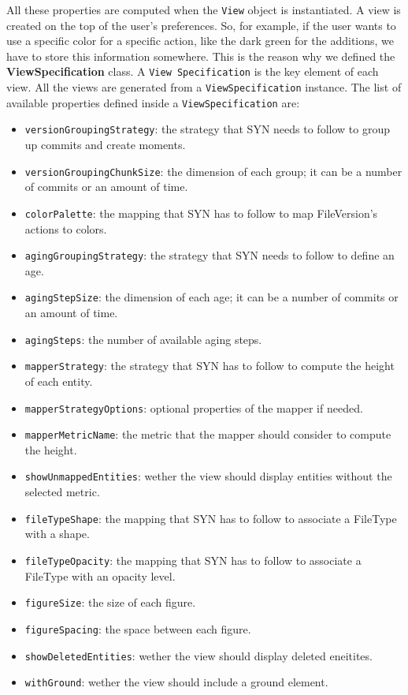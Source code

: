 All these properties are computed when the \texttt{View} object is instantiated. A view is created on the top of the user's preferences. 
So, for example, if the user wants to use a specific color for a specific action, like the dark green for the additions, we have to store this information somewhere. 
This is the reason why we defined the \textbf{ViewSpecification} class. A \texttt{View Specification} is the key element of each view. 
All the views are generated from a \texttt{ViewSpecification} instance. The list of available properties defined inside a \texttt{ViewSpecification} are:
\begin{itemize}
    \item \texttt{versionGroupingStrategy}: the strategy that SYN needs to follow to group up commits and create moments.
    \item \texttt{versionGroupingChunkSize}: the dimension of each group; it can be a number of commits or an amount of time. 
    \item \texttt{colorPalette}: the mapping that SYN has to follow to map FileVersion's actions to colors. 
    \item \texttt{agingGroupingStrategy}: the strategy that SYN needs to follow to define an age.
    \item \texttt{agingStepSize}: the dimension of each age; it can be a number of commits or an amount of time. 
    \item \texttt{agingSteps}: the number of available aging steps. 
    \item \texttt{mapperStrategy}: the strategy that SYN has to follow to compute the height of each entity.
    \item \texttt{mapperStrategyOptions}: optional properties of the mapper if needed.
    \item \texttt{mapperMetricName}: the metric that the mapper should consider to compute the height. 
    \item \texttt{showUnmappedEntities}: wether the view should display entities without the selected metric.
    \item \texttt{fileTypeShape}: the mapping that SYN has to follow to associate a FileType with a shape.
    \item \texttt{fileTypeOpacity}: the mapping that SYN has to follow to associate a FileType with an opacity level.
    \item \texttt{figureSize}: the size of each figure.
    \item \texttt{figureSpacing}: the space between each figure.
    \item \texttt{showDeletedEntities}: wether the view should display deleted eneitites.
    \item \texttt{withGround}: wether the view should include a ground element.
\end{itemize}

